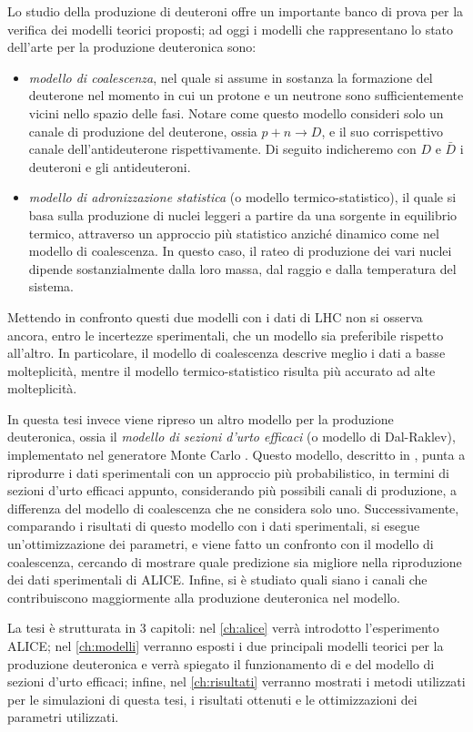 Lo studio della produzione di deuteroni offre un importante banco di prova per la verifica dei modelli teorici proposti; ad oggi i modelli che rappresentano lo stato dell'arte per la produzione deuteronica sono: 
\begin{itemize}
    \item \emph{modello di coalescenza}, nel quale si assume in sostanza la formazione del deuterone nel momento in cui un protone e un neutrone sono sufficientemente vicini nello spazio delle fasi.
    Notare come questo modello consideri solo un canale di produzione del deuterone, ossia $p+n\to D$, e il suo corrispettivo canale dell'antideuterone rispettivamente.
    Di seguito indicheremo con $D$ e $\bar D$ i deuteroni e gli antideuteroni.
    
    \item \emph{modello di adronizzazione statistica} (o modello termico-statistico), il quale si basa sulla produzione di nuclei leggeri a partire da una sorgente in equilibrio termico, attraverso un approccio più statistico anziché dinamico come nel modello di coalescenza.
    In questo caso, il rateo di produzione dei vari nuclei dipende sostanzialmente dalla loro massa, dal raggio e dalla temperatura del sistema. 
\end{itemize}
Mettendo in confronto questi due modelli con i dati di LHC non si osserva ancora, entro le incertezze sperimentali, che un modello sia preferibile rispetto all'altro.
In particolare, il modello di coalescenza descrive meglio i dati a basse molteplicità, mentre il modello termico-statistico risulta più accurato ad alte molteplicità.

In questa tesi invece viene ripreso un altro modello per la produzione deuteronica, ossia il \emph{modello di sezioni d'urto efficaci} (o modello di Dal-Raklev), implementato nel generatore Monte Carlo .
Questo modello, descritto in \cite{Dal_2015}, punta a riprodurre i dati sperimentali con un approccio più probabilistico, in termini di sezioni d'urto efficaci appunto, considerando più possibili canali di produzione, a differenza del modello di coalescenza che ne considera solo uno.
Successivamente, comparando i risultati di questo modello con i dati sperimentali, si esegue un'ottimizzazione dei parametri, e viene fatto un confronto con il modello di coalescenza, cercando di mostrare quale predizione sia migliore nella riproduzione dei dati sperimentali di ALICE.
Infine, si è studiato quali siano i canali che contribuiscono maggiormente alla produzione deuteronica nel modello.

La tesi è strutturata in 3 capitoli: nel \autoref{ch:alice} verrà introdotto l'esperimento ALICE; nel \autoref{ch:modelli} verranno esposti i due principali modelli teorici per la produzione deuteronica e verrà spiegato il funzionamento di  e del modello di sezioni d'urto efficaci; infine, nel \autoref{ch:risultati} verranno mostrati i metodi utilizzati per le simulazioni di questa tesi, i risultati ottenuti e le ottimizzazioni dei parametri utilizzati. 
